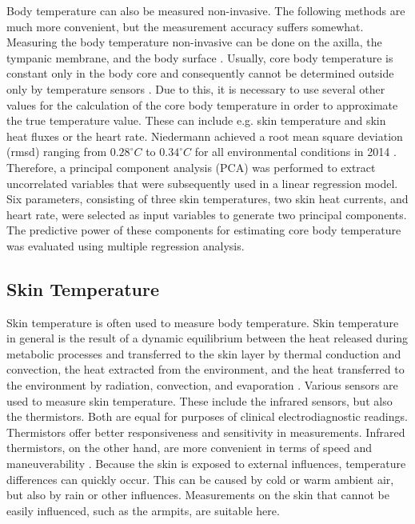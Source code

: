 Body temperature can also be measured non-invasive.
The following methods are much more convenient, but the measurement accuracy suffers somewhat.
Measuring the body temperature non-invasive can be done on the axilla, the tympanic membrane, and the body surface \cite{moranCoreTemperatureMeasurement2002a}.
Usually, core body temperature is constant only in the body core and consequently cannot be determined outside only by temperature sensors \cite{niedermannPredictionHumanCore2014}.
Due to this, it is necessary to use several other values for the calculation of the core body temperature in order to approximate the true temperature value. 
These can include e.g. skin temperature and skin heat fluxes or the heart rate.
Niedermann achieved a root mean square deviation (rmsd) ranging from $0.28 ^\circ C$ to $0.34 ^\circ C$ for all environmental conditions in 2014 \cite{niedermannPredictionHumanCore2014}.
Therefore, a principal component analysis (PCA) was performed to extract uncorrelated variables that were subsequently used in a linear regression model. 
Six parameters, consisting of three skin temperatures, two skin heat currents, and heart rate, were selected as input variables to generate two principal components. 
The predictive power of these components for estimating core body temperature was evaluated using multiple regression analysis.

\subsection{Skin Temperature}
\label{Background:BodyTemperature:SkinTemperature}
Skin temperature is often used to measure body temperature.
Skin temperature in general is the result of a dynamic equilibrium between the heat released during metabolic processes and transferred to the skin layer by thermal conduction and convection, the heat extracted from the environment, and the heat transferred to the environment by radiation, convection, and evaporation \cite{dolibogComparativeAnalysisHuman2022}.
Various sensors are used to measure skin temperature. 
These include the infrared sensors, but also the thermistors. 
Both are equal for purposes of clinical electrodiagnostic readings.
Thermistors offer better responsiveness and sensitivity in measurements.
Infrared thermistors, on the other hand, are more convenient in terms of speed and maneuverability \cite{burnhamThreeTypesSkinSurface2006}.
Because the skin is exposed to external influences, temperature differences can quickly occur.
This can be caused by cold or warm ambient air, but also by rain or other influences.
Measurements on the skin that cannot be easily influenced, such as the armpits, are suitable here.

